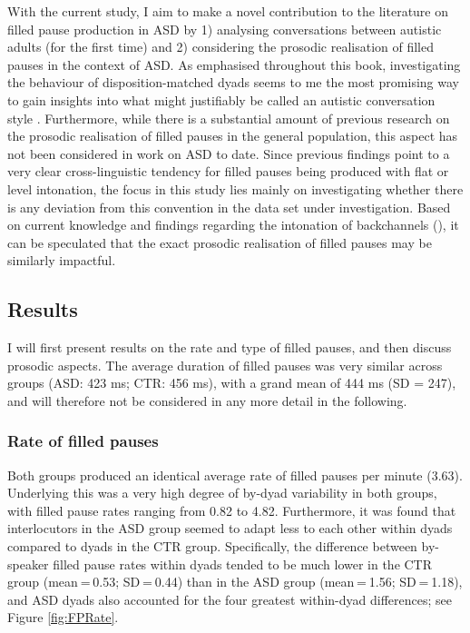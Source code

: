 With the current study, I aim to make a novel contribution to the literature on filled pause production in ASD by 1) analysing conversations between autistic adults (for the first time) and 2) considering the prosodic realisation of filled pauses in the context of ASD. As emphasised throughout this book, investigating the behaviour of disposition-matched dyads seems to me the most promising way to gain insights into what might justifiably be called an autistic conversation style \citep{bolisAutismIntroducingDialectical2017,davisWhatNewFindings2021,miltonOntologicalStatusAutism2012,mitchellAutismDoubleEmpathy2021,sheppardHowEasyIt2016}. Furthermore, while there is a substantial amount of previous research on the prosodic realisation of filled pauses in the general population, this aspect has not been considered in work on ASD to date. Since previous findings point to a very clear cross-linguistic tendency for filled pauses being produced with flat or level intonation, the focus in this study lies mainly on investigating whether there is any deviation from this convention in the data set under investigation. Based on current knowledge and findings regarding the intonation of backchannels (), it can be speculated that the exact prosodic realisation of filled pauses may be similarly impactful.




\subsection{Results}\label{BCFP_FP_results}

I will first present results on the rate and type of filled pauses, and then discuss prosodic aspects. The average duration of filled pauses was very similar across groups (ASD: 423 ms; CTR: 456 ms), with a grand mean of 444 ms (SD = 247), and will therefore not be considered in any more detail in the following.


\subsubsection{Rate of filled pauses}\label{BCFP_FP_results_rate}


Both groups produced an identical average rate of filled pauses per minute (3.63). Underlying this was a very high degree of by-dyad variability in both groups, with filled pause rates ranging from 0.82 to 4.82. Furthermore, it was found that interlocutors in the ASD group seemed to adapt less to each other within dyads compared to dyads in the CTR group. Specifically, the difference between by-speaker filled pause rates within dyads tended to be much lower in the CTR group (mean = 0.53; SD = 0.44) than in the ASD group (mean = 1.56; SD = 1.18), and ASD dyads also accounted for the four greatest within-dyad differences; see Figure \ref{fig:FPRate}. 

